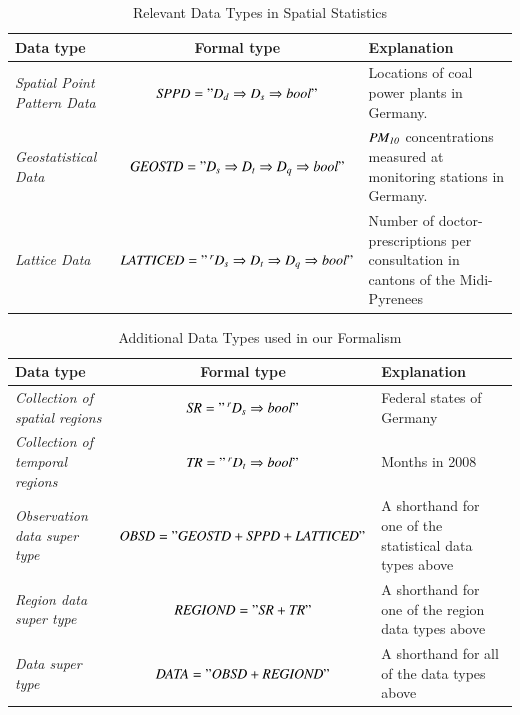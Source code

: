 \documentclass[final,authoryear,1p,times]{elsarticle}
\begin{document}
\begin{table}[htb]
\caption{Relevant Data Types in Spatial Statistics}
\label{tab:statData}
\begin{tabular}[h]{|p{2.5cm}|c|p{4.3cm}|}
			\hline
			\textbf{Data type} & \textbf{Formal type} &  \textbf{Explanation} \\
			\hline
			\textit{Spatial Point Pattern Data} & ${\it SPPD = "D_{d}\Rightarrow D_{s} \Rightarrow bool"}$ &  Locations of coal power plants in Germany. \\
			\hline			
\textit{Geostatistical Data} & ${\it GEOSTD = "D_{s}\Rightarrow D_{t} \Rightarrow D_{q}\Rightarrow bool"}$ &  ${\it PM_{10}}$ concentrations measured at monitoring stations in Germany. \\
			\hline			
\textit{Lattice Data} & ${\it LATTICED = "\prescript{r}{}D_{s}\Rightarrow D_{t} \Rightarrow D_{q}\Rightarrow bool"}$ &  Number of doctor-prescriptions
per consultation in cantons of the Midi-Pyrenees  \\
			\hline			
\end{tabular}
\end{table}

\begin{table}[htb]
\caption{Additional Data Types used in our Formalism}
\label{tab:addData}
\begin{tabular}[h]{|p{2.5cm}|c|p{4cm}|}
			\hline
			\textbf{Data type} & \textbf{Formal type} &  \textbf{Explanation} \\
			\hline
			\textit{Collection of spatial regions} & ${\it SR = "\prescript{r}{}D_s \Rightarrow bool"}$ &  Federal states of Germany \\
			\hline
			 \textit{Collection of temporal regions} & ${\it TR = "\prescript{r}{}D_t \Rightarrow bool"}$  & Months in 2008 \\
			 \hline
			\textit{Observation data super type}& ${\it OBSD = "GEOSTD + SPPD + LATTICED"}$ & A shorthand for one of the statistical data types above\\
			\hline
			\textit{Region data super type}& ${\it REGIOND = "SR + TR"}$ & A shorthand for one of the region data types above\\
			\hline
			\textit{Data super type}& ${\it DATA = "OBSD + REGIOND"}$ & A shorthand for all of the data types above\\
			\hline			
\end{tabular}
\end{table}
\end{document}
